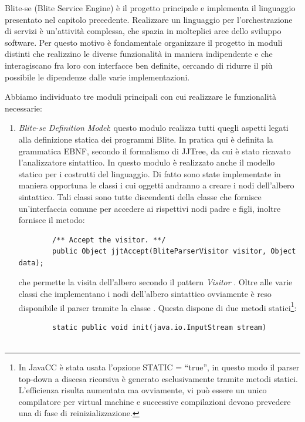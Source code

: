 Blite-se (Blite Service Engine) è il progetto principale e implementa il
linguaggio presentato nel capitolo precedente. Realizzare un linguaggio per
l'orchestrazione di servizi è un'attività complessa, che spazia in molteplici
aree dello sviluppo software. Per questo motivo è fondamentale organizzare il
progetto in moduli distinti che realizzino le diverse funzionalità in maniera
indipendente e che interagiscano fra loro con interfacce ben definite,
cercando di ridurre il più possibile le dipendenze dalle varie implementazioni.

Abbiamo individuato tre moduli principali con cui realizzare le funzionalità
necessarie:

\begin{enumerate}
  \item \emph{Blite-se Definition Model}: questo modulo realizza tutti quegli
  aspetti legati alla definizione statica dei programmi Blite. In pratica
  qui è definita la grammatica EBNF, secondo il formalismo di JJTree, da cui è 
  stato ricavato l'analizzatore sintattico. In questo modulo è realizzato anche
  il modello statico per i costrutti del linguaggio. Di fatto sono state
  implementate in maniera opportuna le classi i cui oggetti andranno a creare i
  nodi dell'albero sintattico. Tali classi sono tutte discendenti della classe
   che fornisce un'interfaccia comune per accedere ai
  rispettivi nodi padre e figli, inoltre fornisce il metodo:
	\begin{lstlisting}
		/** Accept the visitor. **/
		public Object jjtAccept(BliteParserVisitor visitor, Object data);
  	\end{lstlisting}  
  che permette la visita dell'albero secondo il pattern \emph{Visitor}
  \cite{GANGo4}. Oltre alle varie classi che implementano i nodi dell'albero sintattico  
  ovviamente è reso disponibile il parser tramite la classe .
  Questa dispone di due metodi statici\footnote{In JavaCC è stata usata
  l'opzione \textrm{STATIC = ``true''}, in questo modo il parser top-down a
  discesa ricorsiva è generato esclusivamente tramite metodi statici.
  L'efficienza risulta aumentata ma ovviamente, vi può essere un
  unico compilatore per virtual machine e successive compilazioni devono
  prevedere una di fase di reinizializzazione.}:
	\begin{lstlisting}	
		static public void init(java.io.InputStream stream)


\end{lstlisting}
\end{enumerate}
